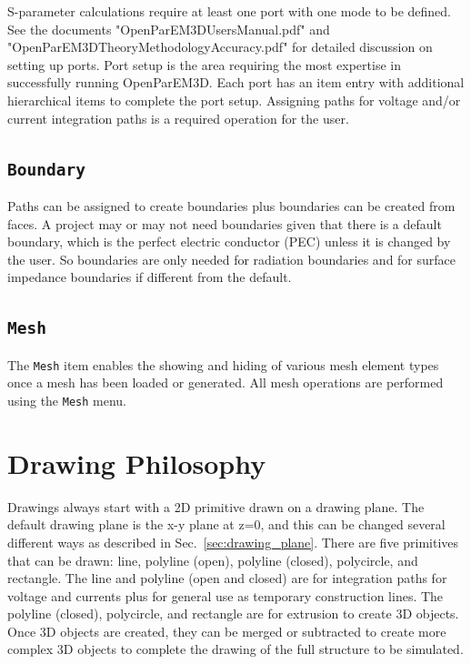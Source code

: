 \documentclass[titlepage]{article}
\renewcommand\_{\textunderscore\linebreak[1]}
\begin{document}
S-parameter calculations require at least one port with one mode to be defined.  See the documents "OpenParEM3D\_Users\_Manual.pdf" and "OpenParEM3D\_Theory\_Methodology\_Accuracy.pdf" for detailed discussion on setting up ports.  Port setup is the area requiring the most expertise in successfully running OpenParEM3D.  Each port has an item entry with additional hierarchical items to complete the port setup.  Assigning paths for voltage and/or current integration paths is a required operation for the user.

\subsection{\texttt{Boundary}}

Paths can be assigned to create boundaries plus boundaries can be created from faces.  A project may or may not need boundaries given that there is a default boundary, which is the perfect electric conductor (PEC) unless it is changed by the user.  So boundaries are only needed for radiation boundaries and for surface impedance boundaries if different from the default.

\subsection{\texttt{Mesh}}

The \texttt{Mesh} item enables the showing and hiding of various mesh element types once a mesh has been loaded or generated.  All mesh operations are performed using the \texttt{Mesh} menu.

\section{Drawing Philosophy}

Drawings always start with a 2D primitive drawn on a drawing plane.  The default drawing plane is the x-y plane at z=0, and this can be changed several different ways as described in Sec.~\ref{sec:drawing_plane}.  There are five primitives that can be drawn: line, polyline (open), polyline (closed), polycircle, and rectangle.  The line and polyline (open and closed) are for integration paths for voltage and currents plus for general use as temporary construction lines.  The polyline (closed), polycircle, and rectangle are for extrusion to create 3D objects.
Once 3D objects are created, they can be merged or subtracted to create more complex 3D objects to complete the drawing of the full structure to be simulated.
\end{document}
